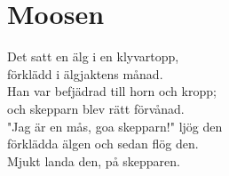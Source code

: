 \section{Moosen}
Det satt en älg i en klyvartopp,\\
förklädd i älgjaktens månad.\\
Han var befjädrad till horn och kropp;\\
och skepparn blev rätt förvånad.\\
"Jag är en mås, goa skepparn!" ljög den\\
förklädda älgen och sedan flög den.\\
Mjukt landa den, på skepparen.\\